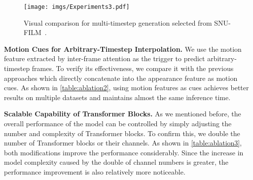 \documentclass[10pt,twocolumn,letterpaper]{article}
\begin{document}
     \begin{figure*}[t]
		\begin{center}
			\texttt{[image: imgs/Experiments3.pdf]}
		\end{center}
		\vspace{-0.20in}
		\caption{Visual comparison for multi-timestep generation selected from SNU-FILM~\cite{choi2020channel}.}
		\label{fig:exp2}
		\vspace{-0.20in}   
     \end{figure*}
    
     \noindent
     \textbf{Motion Cues for Arbitrary-Timestep Interpolation.} We use the motion feature extracted by inter-frame attention as the trigger to predict arbitrary-timestep frames. To verify its effectiveness, we compare it with the previous approaches which directly concatenate  into the appearance feature as motion cues. As shown in \cref{table:ablation2}, using motion features as cues achieves better results on multiple datasets and maintains almost the same inference time.
     
        \begin{table}[t]
        \setlength{\belowcaptionskip}{0pt}
        \renewcommand\arraystretch{1.1}
        \centering
        \caption{Ablation on the scalable capability of Transformer blocks.}
        \vspace{-0.12in}
        \label{table:ablation3}
        \vspace{-0.25in}
        \end{table}

    
     \noindent
     \textbf{Scalable Capability of Transformer Blocks.} As we mentioned before, the overall performance of the model can be controlled by simply adjusting the number and complexity of Transformer blocks. To confirm this, we double the number of Transformer blocks or their channels. As shown in \cref{table:ablation3}, both modifications improve the performance considerably. Since the increase in model complexity caused by the double of channel numbers is greater, the performance improvement is also relatively more noticeable.
    
\end{document}
